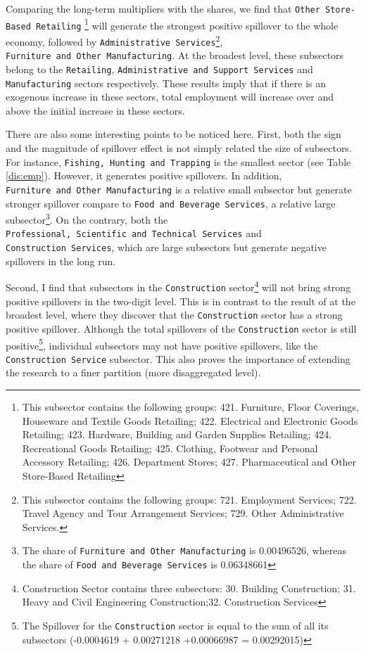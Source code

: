 \documentclass{monashthesis}
\begin{document}
Comparing the long-term multipliers with the shares, we find that \texttt{Other\ Store-Based\ Retailing} \footnote{This subsector contains the following groups: 421. Furniture, Floor Coverings, Houseware and Textile Goods Retailing; 422. Electrical and Electronic Goods Retailing; 423. Hardware, Building and Garden Supplies Retailing; 424. Recreational Goods Retailing; 425. Clothing, Footwear and Personal Accessory Retailing; 426. Department Stores; 427. Pharmaceutical and Other Store-Based Retailing} will generate the strongest positive spillover to the whole economy, followed by \texttt{Administrative\ Services}\footnote{This subsector contains the following groups: 721. Employment Services; 722. Travel Agency and Tour Arrangement Services; 729. Other Administrative Services.}, \texttt{Furniture\ and\ Other\ Manufacturing}. At the broadest level, these subsectors belong to the \texttt{Retailing}, \texttt{Administrative\ and\ Support\ Services} and \texttt{Manufacturing} sectors respectively. These results imply that if there is an exogenous increase in these sectors, total employment will increase over and above the initial increase in these sectors.

There are also some interesting points to be noticed here. First, both the sign and the magnitude of spillover effect is not simply related the size of subsectors. For instance, \texttt{Fishing,\ Hunting\ and\ Trapping} is the smallest sector (see Table \ref{dis:emp}). However, it generates positive spillovers. In addition, \texttt{Furniture\ and\ Other\ Manufacturing} is a relative small subsector but generate stronger spillover compare to \texttt{Food\ and\ Beverage\ Services}, a relative large subsector\footnote{The share of \texttt{Furniture\ and\ Other\ Manufacturing} is 0.00496526, whereas the share of \texttt{Food\ and\ Beverage\ Services} is 0.06348661}. On the contrary, both the \texttt{Professional,\ Scientific\ and\ Technical\ Services} and \texttt{Construction\ Services}, which are large subsectors but generate negative spillovers in the long run.

Second, I find that subsectors in the \texttt{Construction} sector\footnote{Construction Sector contains three subsectors: 30. Building Construction; 31. Heavy and Civil Engineering Construction;32. Construction Services} will not bring strong positive spillovers in the two-digit level. This is in contrast to the result of \textcite{anderson2020} at the broadest level, where they discover that the \texttt{Construction} sector has a strong positive spillover. Although the total spillovers of the \texttt{Construction} sector is still positive\footnote{The Spillover for the \texttt{Construction} sector is equal to the sum of all its subsectors (-0.0004619 + 0.00271218 +0.00066987 = 0.00292015)}, individual subsectors may not have positive spillovers, like the \texttt{Construction\ Service} subsector. This also proves the importance of extending the research to a finer partition (more disaggregated level).
\end{document}
